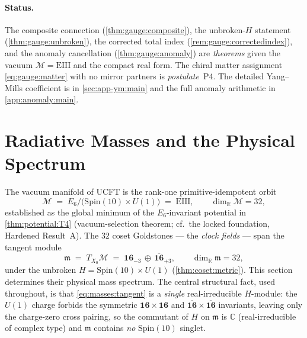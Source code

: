 \documentclass[11pt]{article}
\theoremstyle{plain}
\theoremstyle{definition}
\theoremstyle{remark}
\begin{document}
\paragraph{Status.} The composite connection
(\autoref{thm:gauge:composite}), the unbroken-$H$ statement
(\autoref{thm:gauge:unbroken}), the corrected total index
(\autoref{rem:gauge:correctedindex}), and the anomaly cancellation
(\autoref{thm:gauge:anomaly}) are \emph{theorems} given the vacuum
$\mathcal M=\mathrm{EIII}$ and the compact real form. The chiral matter
assignment \eqref{eq:gauge:matter} with no mirror partners is
\emph{postulate}~P4. The detailed Yang--Mills coefficient is in
\autoref{sec:app-ym:main} and the full anomaly arithmetic in
\autoref{app:anomaly:main}.
\section{Radiative Masses and the Physical Spectrum}
\label{sec:masses:main}

The vacuum manifold of UCFT is the rank-one primitive-idempotent orbit
\[
  \mathcal{M} \;=\; E_{6}/\bigl(\mathrm{Spin}(10)\times U(1)\bigr) \;=\; \mathrm{EIII},
  \qquad \dim_{\mathbb R}\mathcal{M} = 32,
\]
established as the global minimum of the $E_{6}$-invariant potential in
\autoref{thm:potential:T4} (vacuum-selection theorem; cf.\ the locked
foundation, Hardened Result~A). The $32$ coset Goldstones --- the
\emph{clock fields} --- span the tangent module
\begin{equation}\label{eq:masses:tangent}
  \mathfrak m \;=\; T_{X_{0}}\mathcal{M}
  \;=\; \mathbf{16}_{-3}\,\oplus\,\overline{\mathbf{16}}_{+3},
  \qquad \dim_{\mathbb R}\mathfrak m = 32,
\end{equation}
under the unbroken $H=\mathrm{Spin}(10)\times U(1)$ (\autoref{thm:coset:metric}).
This section determines their physical mass spectrum. The central structural
fact, used throughout, is that \eqref{eq:masses:tangent} is a \emph{single}
real-irreducible $H$-module: the $U(1)$ charge forbids the symmetric
$\mathbf{16}\times\mathbf{16}$ and $\overline{\mathbf{16}}\times\overline{\mathbf{16}}$
invariants, leaving only the charge-zero cross pairing, so the commutant of
$H$ on $\mathfrak m$ is $\mathbb C$ (real-irreducible of complex type) and
$\mathfrak m$ contains \emph{no} $\mathrm{Spin}(10)$ singlet.
\end{document}
